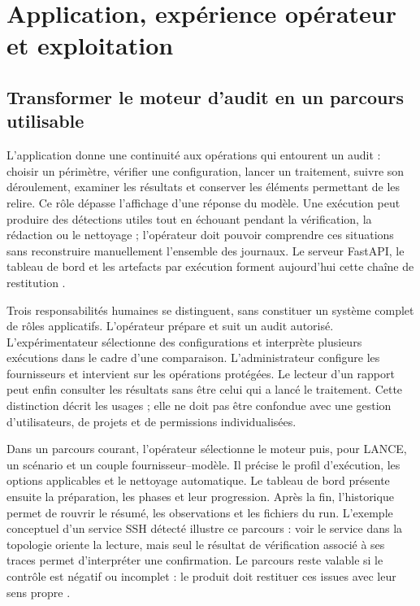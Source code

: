 \documentclass[11pt,a4paper]{article}
\begin{document}
\section{Application, expérience opérateur et exploitation}
\label{sec:application}

\subsection{Transformer le moteur d'audit en un parcours utilisable}
L'application donne une continuité aux opérations qui entourent un audit :
choisir un périmètre, vérifier une configuration, lancer un traitement, suivre
son déroulement, examiner les résultats et conserver les éléments permettant
de les relire. Ce rôle dépasse l'affichage d'une réponse du modèle. Une
exécution peut produire des détections utiles tout en échouant pendant la
vérification, la rédaction ou le nettoyage ; l'opérateur doit pouvoir comprendre
ces situations sans reconstruire manuellement l'ensemble des journaux. Le
serveur FastAPI, le tableau de bord et les artefacts par exécution forment
aujourd'hui cette chaîne de restitution \cite{app-main,app-runs,app-ui}.

Trois responsabilités humaines se distinguent, sans constituer un système
complet de rôles applicatifs. L'opérateur prépare et suit un audit autorisé.
L'expérimentateur sélectionne des configurations et interprète plusieurs
exécutions dans le cadre d'une comparaison. L'administrateur configure les
fournisseurs et intervient sur les opérations protégées. Le lecteur d'un rapport
peut enfin consulter les résultats sans être celui qui a lancé le traitement.
Cette distinction décrit les usages ; elle ne doit pas être confondue avec
une gestion d'utilisateurs, de projets et de permissions individualisées.

Dans un parcours courant, l'opérateur sélectionne le moteur puis, pour LANCE,
un scénario et un couple fournisseur--modèle. Il précise le profil d'exécution,
les options applicables et le nettoyage automatique. Le tableau de bord présente
ensuite la préparation, les phases et leur progression. Après la fin, l'historique
permet de rouvrir le résumé, les observations et les fichiers du run. L'exemple
conceptuel d'un service SSH détecté illustre ce parcours : voir le service dans
la topologie oriente la lecture, mais seul le résultat de vérification associé
à ses traces permet d'interpréter une confirmation. Le parcours reste valable
si le contrôle est négatif ou incomplet : le produit doit restituer ces issues
avec leur sens propre \cite{app-modes,app-ui}.
\end{document}
